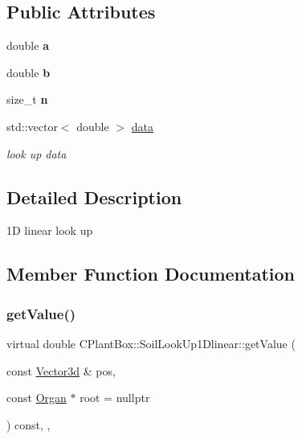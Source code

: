 \subsection*{Public Attributes}
\begin{DoxyCompactItemize}
\item 
\mbox{\label{classCPlantBox_1_1SoilLookUp1Dlinear_ab1017c25e42639470742da19c3f7bb55}} 
double {\bfseries a}
\item 
\mbox{\label{classCPlantBox_1_1SoilLookUp1Dlinear_a6c637904f737b79692565b6ee9f3f229}} 
double {\bfseries b}
\item 
\mbox{\label{classCPlantBox_1_1SoilLookUp1Dlinear_a355a6fbef5a8e411922fdbce9aec84b6}} 
size\+\_\+t {\bfseries n}
\item 
\mbox{\label{classCPlantBox_1_1SoilLookUp1Dlinear_a6e85d93cebb2f80ad82bd60f65d7c9aa}} 
std\+::vector$<$ double $>$ \hyperlink{classCPlantBox_1_1SoilLookUp1Dlinear_a6e85d93cebb2f80ad82bd60f65d7c9aa}{data}
\begin{DoxyCompactList}\small\item\em look up data \end{DoxyCompactList}\end{DoxyCompactItemize}


\subsection{Detailed Description}
1D linear look up 

\subsection{Member Function Documentation}
\mbox{\label{classCPlantBox_1_1SoilLookUp1Dlinear_ae2d2ada13590b9b118f207f647652db8}} 
\subsubsection{\texorpdfstring{get\+Value()}{getValue()}}
{\footnotesize\ttfamily virtual double C\+Plant\+Box\+::\+Soil\+Look\+Up1\+Dlinear\+::get\+Value (\begin{DoxyParamCaption}\item[{const \hyperlink{classCPlantBox_1_1Vector3d}{Vector3d} \&}]{pos,  }\item[{const \hyperlink{classCPlantBox_1_1Organ}{Organ} $\ast$}]{root = {\ttfamily nullptr} }\end{DoxyParamCaption}) const\hspace{0.3cm}{\ttfamily [inline]}, {\ttfamily [override]}, {\ttfamily [virtual]}}



